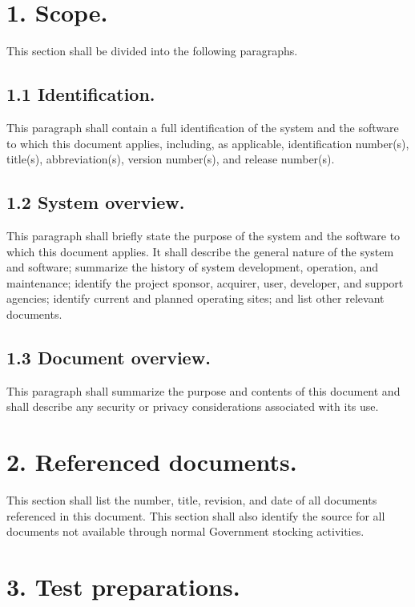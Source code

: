 \section{1. Scope.}

This section shall be divided into the following paragraphs.

\subsection{1.1 Identification.}

This paragraph shall contain a full identification of the system and the
software to which this document applies, including, as applicable,
identification number(s), title(s), abbreviation(s), version number(s),
and release number(s).

\subsection{1.2 System overview.}

This paragraph shall briefly state the purpose of the system and the
software to which this document applies. It shall describe the general
nature of the system and software; summarize the history of system
development, operation, and maintenance; identify the project sponsor,
acquirer, user, developer, and support agencies; identify current and
planned operating sites; and list other relevant documents.

\subsection{1.3 Document overview.}

This paragraph shall summarize the purpose and contents of this document
and shall describe any security or privacy considerations associated
with its use.

\section{2. Referenced documents.}

This section shall list the number, title, revision, and date of all
documents referenced in this document. This section shall also identify
the source for all documents not available through normal Government
stocking activities.

\section{3. Test preparations.}

